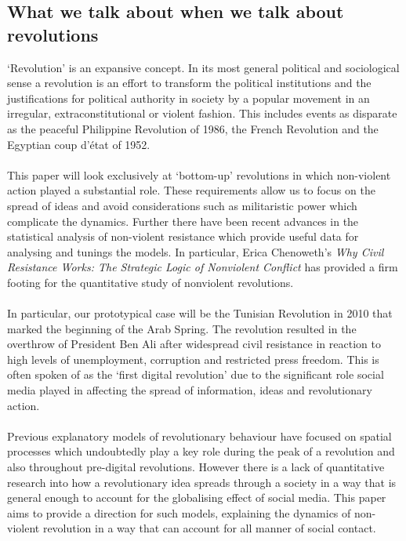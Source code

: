 \subsection{What we talk about when we talk about revolutions}
`Revolution' is an expansive concept. In its most general political and sociological sense a revolution is an effort to transform the political institutions and the justifications for political authority in society by a popular movement in an irregular, extraconstitutional or violent fashion\cite{goldstone_2001}\cite{goodwin-2006}.
This includes events as disparate as the peaceful Philippine Revolution of 1986, the French Revolution and the Egyptian coup d'\'etat of 1952.\\
\\
This paper will look exclusively at `bottom-up' revolutions in which non-violent action played a substantial role. These requirements allow us to focus on the spread of ideas and avoid considerations such as militaristic power which complicate the dynamics. Further there have been recent advances in the statistical analysis of non-violent resistance which provide useful data for analysing and tunings the models. In particular, Erica Chenoweth's \textit{Why Civil Resistance Works: The Strategic Logic of Nonviolent Conflict} has provided a firm footing for the quantitative study of nonviolent revolutions\cite{logic-non-violence}.\\
\\
In particular, our prototypical case will be the Tunisian Revolution in 2010 that marked the beginning of the Arab Spring. The revolution resulted in the overthrow of President Ben Ali after widespread civil resistance in reaction to high levels of unemployment, corruption and restricted press freedom\cite{andrew-gee_2018}. This is often spoken of as the `first digital revolution' due to the significant role social media played in affecting the spread of information, ideas and revolutionary action\cite{social-networks-tunisia}.\\
\\
Previous explanatory models of revolutionary behaviour have focused on spatial processes which undoubtedly play a key role during the peak of a revolution and also throughout pre-digital revolutions\cite{epstein}. However there is a lack of quantitative research into how a revolutionary idea spreads through a society in a way that is general enough to account for the globalising effect of social media. This paper aims to provide a direction for such models, explaining the dynamics of non-violent revolution in a way that can account for all manner of social contact.

